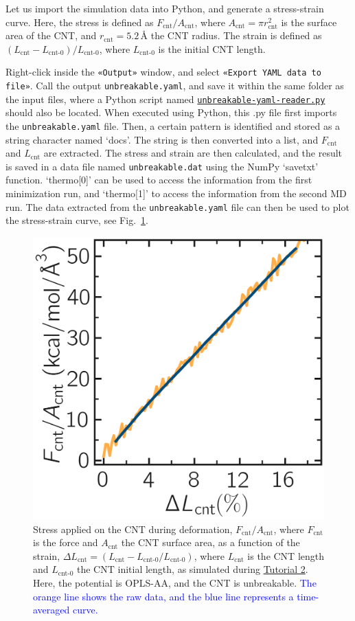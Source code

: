 \documentclass[9pt,tutorial]{livecoms}
\newcommand{\flecmd}[1]{\textcolor{command}{\texttt{#1}}} %
\newcommand{\guicmd}[1]{\textcolor{command}{\texttt{«#1»}}} %
\newcommand{\dwlcmd}[1]{\textcolor{download}{\texttt{#1}}} %
\newcommand{\filepath}{https://raw.githubusercontent.com/lammpstutorials/lammpstutorials-article/main/files/}
\begin{document}
Let us import the simulation data into Python, and generate a stress-strain curve.
Here, the stress is defined as $F_\text{cnt}/A_\text{cnt}$,
where $A_\text{cnt} = \pi r_\text{cnt}^2$ is the surface area of the
CNT, and $r_\text{cnt}=5.2$\,\AA{} the CNT radius.  The strain is defined
as $(L_\text{cnt}-L_\text{cnt-0})/L_\text{cnt-0}$, where $L_\text{cnt-0}$ is the initial CNT length.

Right-click inside the \guicmd{Output} window, and select
\guicmd{Export YAML data to file}.  Call the output \flecmd{unbreakable.yaml}, and save
it within the same folder as the input files, where a Python script named
\href{\filepath tutorial2/unbreakable-yaml-reader.py}{\dwlcmd{unbreakable-yaml-reader.py}} should also
be located.  When executed using Python, this .py file first imports
the \flecmd{unbreakable.yaml} file.  Then, a certain pattern is
identified and stored as a string character named `docs'.  The string is
then converted into a list, and $F_\text{cnt}$ and $L_\text{cnt}$
are extracted.  The stress and strain are then calculated, and the result
is saved in a data file named \flecmd{unbreakable.dat} using
the NumPy `savetxt' function.  `thermo[0]' can be used to access the
information from the first minimization run, and `thermo[1]' to access the
information from the second MD run.  The data extracted from
the \flecmd{unbreakable.yaml} file can then be used to plot the stress-strain
curve, see Fig.~\ref{fig:CNT-stress-strain-unbreakable}.

\begin{figure}
\centering
\includegraphics[width=0.55\linewidth]{CNT-unbreakable-stress-strain}
\caption{Stress applied on the CNT during deformation, $F_\text{cnt}/A_\text{cnt}$,
where $F_\text{cnt}$ is the force and $A_\text{cnt}$ the CNT surface area,
as a function of the strain, $\Delta L_\text{cnt} = (L_\text{cnt}-L_\text{cnt-0}/L_\text{cnt-0})$, where
$L_\text{cnt}$ is the CNT length and $L_\text{cnt-0}$ the CNT initial length,
as simulated during \hyperref[carbon-nanotube-label]{Tutorial 2}.
Here, the potential is OPLS-AA, and the CNT is unbreakable. \textcolor{blue}{The orange line
shows the raw data, and the blue line represents a time-averaged curve.}
}
\label{fig:CNT-stress-strain-unbreakable}
\end{figure}
\end{document}

